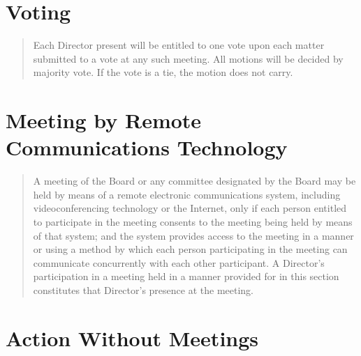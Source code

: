 \documentclass[
]{book}
\begin{document}
\section{Voting}\label{voting}

\begin{quote}
Each Director present will be entitled to one vote upon each matter
submitted to a vote at any such meeting. All motions will be decided
by majority vote. If the vote is a tie, the motion does not carry.
\end{quote}

\section{Meeting by Remote Communications Technology}\label{meeting-by-remote-communications-technology}

\begin{quote}
A meeting of the Board or any committee designated by the Board may be
held by means of a remote electronic communications system, including
videoconferencing technology or the Internet, only if each person
entitled to participate in the meeting consents to the meeting being
held by means of that system; and the system provides access to the
meeting in a manner or using a method by which each person
participating in the meeting can communicate concurrently with each
other participant. A Director's participation in a meeting held in a
manner provided for in this section constitutes that Director's
presence at the meeting.
\end{quote}

\section{Action Without Meetings}\label{action-without-meetings}
\end{document}
